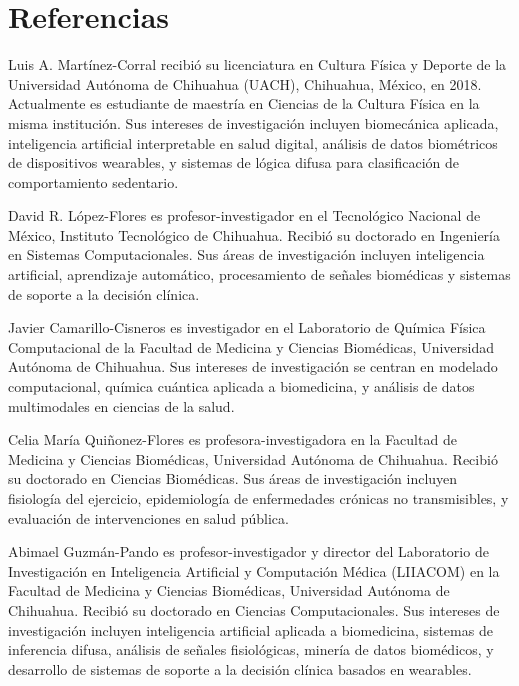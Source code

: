 \documentclass[journal,twoside,web]{ieeecolor}
\begin{document}
\section*{Referencias}




\begin{IEEEbiographynophoto}{Luis A. Martínez-Corral} recibió su licenciatura en Cultura Física y Deporte de la Universidad Autónoma de Chihuahua (UACH), Chihuahua, México, en 2018. Actualmente es estudiante de maestría en Ciencias de la Cultura Física en la misma institución. Sus intereses de investigación incluyen biomecánica aplicada, inteligencia artificial interpretable en salud digital, análisis de datos biométricos de dispositivos wearables, y sistemas de lógica difusa para clasificación de comportamiento sedentario.
\end{IEEEbiographynophoto}

\begin{IEEEbiographynophoto}{David R. López-Flores} es profesor-investigador en el Tecnológico Nacional de México, Instituto Tecnológico de Chihuahua. Recibió su doctorado en Ingeniería en Sistemas Computacionales. Sus áreas de investigación incluyen inteligencia artificial, aprendizaje automático, procesamiento de señales biomédicas y sistemas de soporte a la decisión clínica.
\end{IEEEbiographynophoto}

\begin{IEEEbiographynophoto}{Javier Camarillo-Cisneros} es investigador en el Laboratorio de Química Física Computacional de la Facultad de Medicina y Ciencias Biomédicas, Universidad Autónoma de Chihuahua. Sus intereses de investigación se centran en modelado computacional, química cuántica aplicada a biomedicina, y análisis de datos multimodales en ciencias de la salud.
\end{IEEEbiographynophoto}

\begin{IEEEbiographynophoto}{Celia María Quiñonez-Flores} es profesora-investigadora en la Facultad de Medicina y Ciencias Biomédicas, Universidad Autónoma de Chihuahua. Recibió su doctorado en Ciencias Biomédicas. Sus áreas de investigación incluyen fisiología del ejercicio, epidemiología de enfermedades crónicas no transmisibles, y evaluación de intervenciones en salud pública.
\end{IEEEbiographynophoto}

\begin{IEEEbiographynophoto}{Abimael Guzmán-Pando} es profesor-investigador y director del Laboratorio de Investigación en Inteligencia Artificial y Computación Médica (LIIACOM) en la Facultad de Medicina y Ciencias Biomédicas, Universidad Autónoma de Chihuahua. Recibió su doctorado en Ciencias Computacionales. Sus intereses de investigación incluyen inteligencia artificial aplicada a biomedicina, sistemas de inferencia difusa, análisis de señales fisiológicas, minería de datos biomédicos, y desarrollo de sistemas de soporte a la decisión clínica basados en wearables.
\end{IEEEbiographynophoto}
\end{document}
